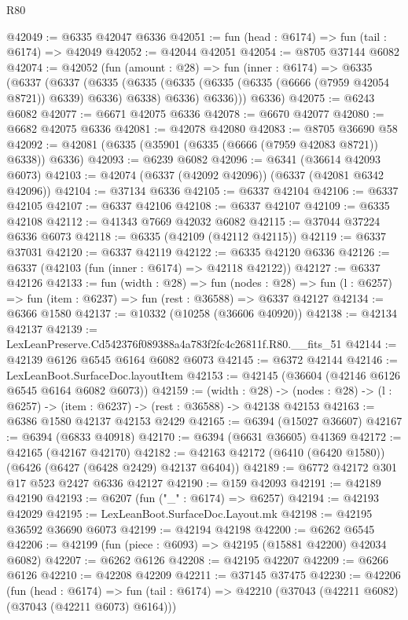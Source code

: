 \begin{lexlean}{R80}
\begin{coremodule}
@42049 := @6335 @42047 @6336
@42051 := fun (head : @6174) => fun (tail : @6174) => @42049
@42052 := @42044 @42051
@42054 := @8705 @37144 @6082
@42074 := @42052
    (fun (amount : @28) =>
    fun (inner : @6174) =>
    @6335
      (@6337
        (@6337
          (@6335
            (@6335 (@6335 (@6335 (@6335 (@6666 (@7959 @42054 @8721)) @6339) @6336) @6338) @6336)
            @6336)))
      @6336)
@42075 := @6243 @6082
@42077 := @6671 @42075 @6336
@42078 := @6670 @42077
@42080 := @6682 @42075 @6336
@42081 := @42078 @42080
@42083 := @8705 @36690 @58
@42092 := @42081 (@6335 (@35901 (@6335 (@6666 (@7959 @42083 @8721)) @6338)) @6336)
@42093 := @6239 @6082
@42096 := @6341 (@36614 @42093 @6073)
@42103 := @42074 (@6337 (@42092 @42096)) (@6337 (@42081 @6342 @42096))
@42104 := @37134 @6336
@42105 := @6337 @42104
@42106 := @6337 @42105
@42107 := @6337 @42106
@42108 := @6337 @42107
@42109 := @6335 @42108
@42112 := @41343 @7669 @42032 @6082
@42115 := @37044 @37224 @6336 @6073
@42118 := @6335 (@42109 (@42112 @42115))
@42119 := @6337 @37031
@42120 := @6337 @42119
@42122 := @6335 @42120 @6336
@42126 := @6337 (@42103 (fun (inner : @6174) => @42118 @42122))
@42127 := @6337 @42126
@42133 := fun (width : @28) =>
  fun (nodes : @28) => fun (l : @6257) => fun (item : @6237) => fun (rest : @36588) => @6337 @42127
@42134 := @6366 @1580
@42137 := @10332 (@10258 (@36606 @40920))
@42138 := @42134 @42137
@42139 := LexLeanPreserve.Cd542376f089388a4a783f2fc4c26811f.R80.__fits_51
@42144 := @42139 @6126 @6545 @6164 @6082 @6073
@42145 := @6372 @42144
@42146 := LexLeanBoot.SurfaceDoc.layoutItem
@42153 := @42145 (@36604 (@42146 @6126 @6545 @6164 @6082 @6073))
@42159 := (width : @28) ->
  (nodes : @28) -> (l : @6257) -> (item : @6237) -> (rest : @36588) -> @42138 @42153
@42163 := @6386 @1580 @42137 @42153 @2429
@42165 := @6394 (@15027 @36607)
@42167 := @6394 (@6833 @40918)
@42170 := @6394 (@6631 @36605) @41369
@42172 := @42165 (@42167 @42170)
@42182 := @42163 @42172 (@6410 (@6420 @1580)) (@6426 (@6427 (@6428 @2429) @42137 @6404))
@42189 := @6772 @42172 @301 @17 @523 @2427 @6336 @42127
@42190 := @159 @42093
@42191 := @42189 @42190
@42193 := @6207 (fun ("_" : @6174) => @6257)
@42194 := @42193 @42029
@42195 := LexLeanBoot.SurfaceDoc.Layout.mk
@42198 := @42195 @36592 @36690 @6073
@42199 := @42194 @42198
@42200 := @6262 @6545
@42206 := @42199 (fun (piece : @6093) => @42195 (@15881 @42200) @42034 @6082)
@42207 := @6262 @6126
@42208 := @42195 @42207
@42209 := @6266 @6126
@42210 := @42208 @42209
@42211 := @37145 @37475
@42230 := @42206
    (fun (head : @6174) =>
    fun (tail : @6174) => @42210 (@37043 (@42211 @6082) (@37043 (@42211 @6073) @6164)))

\end{coremodule}
\end{lexlean}
